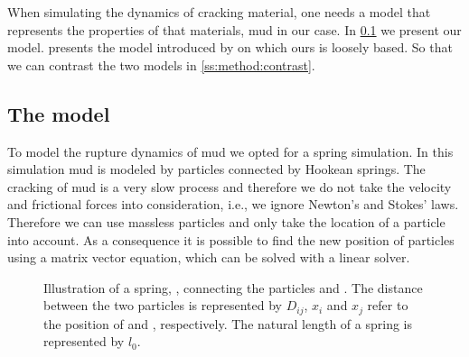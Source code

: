 
When simulating the dynamics of cracking material, one needs a model that represents the properties of that materials, mud in our case. In \cref{ss:method:model} we present our model.  presents the model introduced by \citeauthor{vogel2005studies2} on which ours is loosely based. So that we can contrast the two models in \cref{ss:method:contrast}.

\subsection{The model}\label{ss:method:model}
To model the rupture dynamics of mud we opted for a spring simulation. In this simulation mud is modeled by particles connected by Hookean springs. The cracking of mud is a very slow process and therefore we do not take the velocity and frictional forces into consideration, i.e., we ignore Newton's and Stokes' laws. Therefore we can use massless particles and only take the location of a particle into account. As a consequence it is possible to find the new position of particles using a matrix vector equation, which can be solved with a linear solver.

\begin{figure}
	\centering
	\caption{Illustration of a spring, , connecting the particles  and . The distance between the two particles is represented by $D_{ij}$, $x_i$ and $x_j$ refer to the position of  and , respectively. The natural length of a spring is represented by $l_0$.}
	\label{fig:method:spring}
\end{figure}


